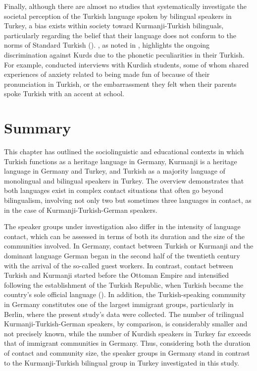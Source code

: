 Finally, although there are almost no studies that systematically investigate the societal perception of the Turkish language spoken by bilingual speakers in Turkey, a bias exists within society toward Kurmanji-Turkish bilinguals, particularly regarding the belief that their language does not conform to the norms of Standard Turkish (\citealt{DemirciKleiner1999}). \citet{Tulgar2010}, as noted in \citet{Inal2019}, highlights the ongoing discrimination against Kurds due to the phonetic peculiarities in their Turkish. For example, \citet{Sahin-firat2010} conducted interviews with Kurdish students, some of whom shared experiences of anxiety related to being made fun of because of their pronunciation in Turkish, or the embarrassment they felt when their parents spoke Turkish with an accent at school.

\section{Summary}\label{sec:key:2.4}
\largerpage
This chapter has outlined the sociolinguistic and educational contexts in which Turkish functions as a heritage language in Germany, Kurmanji is a heritage language in Germany and Turkey, and Turkish as a majority language of monolingual and bilingual speakers in Turkey. The overview demonstrates that both languages exist in complex contact situations that often go beyond bilingualism, involving not only two but sometimes three languages in contact, as in the case of Kurmanji-Turkish-German speakers.

The speaker groups under investigation also differ in the intensity of language contact, which can be assessed in terms of both its duration and the size of the communities involved. In Germany, contact between Turkish or Kurmanji and the dominant language German began in the second half of the twentieth century with the arrival of the so-called guest workers. In contrast, contact between Turkish and Kurmanji started before the Ottoman Empire and intensified following the establishment of the Turkish Republic, when Turkish became the country’s sole official language (\citealt{Yagmur2001}). In addition, the Turkish-speaking community in Germany constitutes one of the largest immigrant groups, particularly in Berlin, where the present study’s data were collected. The number of trilingual Kurmanji-Turkish-German speakers, by comparison, is considerably smaller and not precisely known, while the number of Kurdish speakers in Turkey far exceeds that of immigrant communities in Germany. Thus, considering both the duration of contact and community size, the speaker groups in Germany stand in contrast to the Kurmanji-Turkish bilingual group in Turkey investigated in this study.

